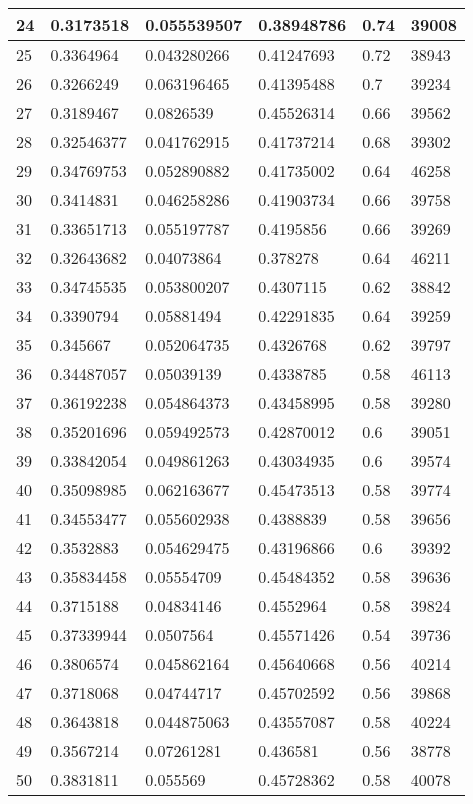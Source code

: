 \begin{longtable}{|l|l|l|l|l|l|}
24 & 0.3173518 & 0.055539507 & 0.38948786 & 0.74 & 39008 \\ \hline 
25 & 0.3364964 & 0.043280266 & 0.41247693 & 0.72 & 38943 \\ \hline 
26 & 0.3266249 & 0.063196465 & 0.41395488 & 0.7 & 39234 \\ \hline 
27 & 0.3189467 & 0.0826539 & 0.45526314 & 0.66 & 39562 \\ \hline 
28 & 0.32546377 & 0.041762915 & 0.41737214 & 0.68 & 39302 \\ \hline 
29 & 0.34769753 & 0.052890882 & 0.41735002 & 0.64 & 46258 \\ \hline 
30 & 0.3414831 & 0.046258286 & 0.41903734 & 0.66 & 39758 \\ \hline 
31 & 0.33651713 & 0.055197787 & 0.4195856 & 0.66 & 39269 \\ \hline 
32 & 0.32643682 & 0.04073864 & 0.378278 & 0.64 & 46211 \\ \hline 
33 & 0.34745535 & 0.053800207 & 0.4307115 & 0.62 & 38842 \\ \hline 
34 & 0.3390794 & 0.05881494 & 0.42291835 & 0.64 & 39259 \\ \hline 
35 & 0.345667 & 0.052064735 & 0.4326768 & 0.62 & 39797 \\ \hline 
36 & 0.34487057 & 0.05039139 & 0.4338785 & 0.58 & 46113 \\ \hline 
37 & 0.36192238 & 0.054864373 & 0.43458995 & 0.58 & 39280 \\ \hline 
38 & 0.35201696 & 0.059492573 & 0.42870012 & 0.6 & 39051 \\ \hline 
39 & 0.33842054 & 0.049861263 & 0.43034935 & 0.6 & 39574 \\ \hline 
40 & 0.35098985 & 0.062163677 & 0.45473513 & 0.58 & 39774 \\ \hline 
41 & 0.34553477 & 0.055602938 & 0.4388839 & 0.58 & 39656 \\ \hline 
42 & 0.3532883 & 0.054629475 & 0.43196866 & 0.6 & 39392 \\ \hline 
43 & 0.35834458 & 0.05554709 & 0.45484352 & 0.58 & 39636 \\ \hline 
44 & 0.3715188 & 0.04834146 & 0.4552964 & 0.58 & 39824 \\ \hline 
45 & 0.37339944 & 0.0507564 & 0.45571426 & 0.54 & 39736 \\ \hline 
46 & 0.3806574 & 0.045862164 & 0.45640668 & 0.56 & 40214 \\ \hline 
47 & 0.3718068 & 0.04744717 & 0.45702592 & 0.56 & 39868 \\ \hline 
48 & 0.3643818 & 0.044875063 & 0.43557087 & 0.58 & 40224 \\ \hline 
49 & 0.3567214 & 0.07261281 & 0.436581 & 0.56 & 38778 \\ \hline 
50 & 0.3831811 & 0.055569 & 0.45728362 & 0.58 & 40078 \\ \hline 
\end{longtable}